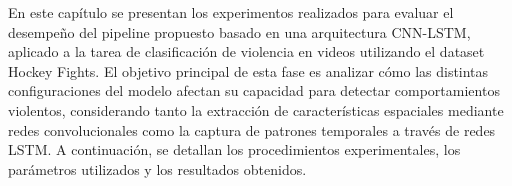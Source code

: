 En este capítulo se presentan los experimentos realizados 
para evaluar el desempeño del pipeline propuesto basado 
en una arquitectura CNN-LSTM, aplicado a la tarea de 
clasificación de violencia en videos utilizando el dataset 
Hockey Fights. El objetivo principal de esta fase es 
analizar cómo las distintas configuraciones del modelo 
afectan su capacidad para detectar comportamientos 
violentos, considerando tanto la extracción de características 
espaciales mediante redes convolucionales como la captura de 
patrones temporales a través de redes LSTM. A continuación, 
se detallan los procedimientos experimentales, los parámetros 
utilizados y los resultados obtenidos.

